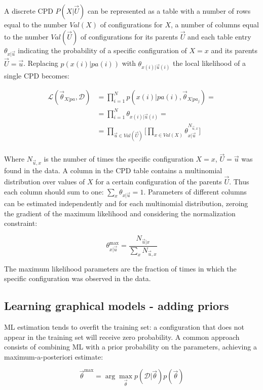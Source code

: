 		A discrete CPD $P(X|\vec{U})$ can be represented as a table with a number of rows equal to the number $Val(X)$ of configurations for $X$, a number of columns equal to the number $Val(\vec{U})$ of configurations for its parents $\vec{U}$ and each table entry $\theta_{x|\vec{u}}$ indicating the probability of a specific configuration of $X=x$ and its parents $\vec{U}=\vec{u}$.
		Replacing $p(x(i)|pa(i))$ with $\theta_{x(i)|\vec{u}(i)}$ the local likelihood of a single CPD becomes:

		\begin{align*}
			\mathcal{L}(\vec{\theta}_{X|pa}, \mathcal{D}) &= \prod\limits_{i=1}^Np(x(i)|pa(i), \vec{\theta}_{X|pa_j})=\\
																									 &=\prod\limits_{i=1}^N\theta_{x(i)|\vec{u}(i)}=\\
																									 &=\prod\limits_{\vec{u}\in Val(\vec{U})}\biggl[\prod\limits_{x\in Val(X)}\theta_{x|\vec{u}}^{N_{\vec{u}, x}}\biggr]\\
		\end{align*}

		Where $N_{\vec{u},x}$ is the number of times the specific configuration $X=x$, $\vec{U}=\vec{u}$ was found in the data.
		A column in the CPD table contains a multinomial distribution over values of $X$ for a certain configuration of the parents $\vec{U}$.
		Thus each column should sum to one: $\sum\limits_{x}\theta_{x|\vec{u}}=1$.
		Parameters of different columns can be estimated independently and for each multinomial distribution, zeroing the gradient of the maximum likelihood and considering the normalization constraint:

		$$\theta_{x|\vec{u}}^{\max}=\frac{N_{\vec{u}|x}}{\sum\limits_{x}N_{\vec{u},x}}$$

		The maximum likelihood parameters are the fraction of times in which the specific configuration was observed in the data.

	\subsection{Learning graphical models - adding priors}
	ML estimation tends to overfit the training set: a configuration that does not appear in the training set will receive zero probability.
	A common approach consists of combining ML with a prior probability on the parameters, achieving a maximum-a-posteriori estimate:

	$$\vec{\theta}^{\max} = \arg\max\limits_{\vec{\theta}}p(\mathcal{D}|\vec{\theta})p(\vec{\theta})$$

